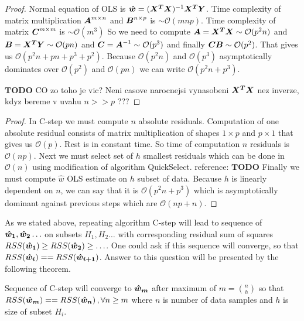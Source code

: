 \begin{proof}
	Normal equation of OLS is $\vec{\hat{w}} = (\m{X^T}\m{X})^{-1}\m{X^T}\m{Y}$.
	Time complexity  of matrix multiplication $\m{A}^{m \times n}$ and  $\m{B}^{n \times p}$ is $\sim \mathcal{O}(mnp)$.
	Time complexity of matrix $\m{C}^{m \times m}$ is $\sim \mathcal{O}(m^3)$
	So we need to compute 
	$\m{A} = \m{X^T}\m{X} \sim \mathcal{O}(p^2n)$ and
	$\m{B} = \m{X^T}\m{Y} \sim \mathcal{O}(pn)$ and
	$\m{C} = \m{A}^{-1} \sim \mathcal{O}(p^3)$ and finally 
	$\m{C}\m{B} \sim \mathcal{O}(p^2)$. 
	That gives us $\mathcal{O}(p^2n + pn + p^3 + p^2)$. Because  $\mathcal{O}(p^2n)$ and 
	$\mathcal{O}(p^3)$ asymptotically dominates over $\mathcal{O}(p^2)$ and $\mathcal{O}(pn)$ we can
	write $\mathcal{O}(p^2n + p^3)$.

	$\boldsymbol{{TODO}}$ CO zo toho je vic? Neni casove narocnejsi vynasobeni $\m{X^T}\m{X}$ nez inverze, kdyz bereme v uvahu $n >> p$ ???
\end{proof}

\begin{proof}
	In C-step we must compute $n$ absolute residuals. Computation of one absolute residual consists of
	matrix multiplication of shapes $1 \times p$ and $p \times 1$ that gives us $\mathcal{O}(p)$. Rest is in constant time.
	So time of computation $n$ residuals is $\mathcal{O}(np)$.
	Next we must select set of $h$ smallest residuals which can be done in $\mathcal{O}(n)$ using modification 
	of algorithm QuickSelect. reference: $\boldsymbol{{TODO}}$
	Finally we must compute $\hat{w}$ OLS estimate on $h$ subset of data.
	Because $h$ is linearly dependent on $n$, we can say that it is $\mathcal{O}(p^2n + p^3)$ which 
	is asymptotically dominant against previous steps which are $\mathcal{O}(np + n)$.
\end{proof}

As we stated above, repeating algorithm C-step will lead to sequence of $\boldsymbol{\hat{w}_1}, \boldsymbol{\hat{w}_2} \ldots$ 
on subsets $H_1, H_2 \ldots$ with corresponding residual sum of squares
$RSS(\boldsymbol{\hat{w}_{1}}) \geq RSS(\boldsymbol{\hat{w}_{2}}) \geq \ldots$. One could ask if this sequence will converge, so that
$RSS(\boldsymbol{\hat{w}_{i}}) == RSS(\boldsymbol{\hat{w}_{i+1}})$. 
Answer to this question will be presented by the following theorem.


\begin{theorem}
	Sequence of C-step will converge to $\boldsymbol{\hat{w}_{m}}$ after maximum of $m = {n \choose h}$
	so that $RSS(\boldsymbol{\hat{w}_{m}}) == RSS(\boldsymbol{\hat{w}_{n}})\,, \forall n\geq m$ where $n$ is number of data samples 
	and $h$ is size of subset $H_i$.
\end{theorem}

